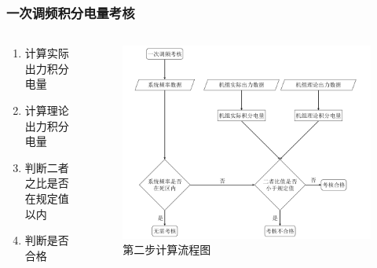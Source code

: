 \documentclass[aspectratio=169, 10pt, utf8, mathserif]{beamer}
\begin{document}
	\begin{frame}
	\frametitle{一次调频积分电量考核}
	
	\begin{columns}
		\begin{column}{.4\linewidth}
			\begin{enumerate}
				\item 计算实际出力积分电量
				\item 计算理论出力积分电量
				\item 判断二者之比是否在规定值以内
				\item 判断是否合格
			\end{enumerate}
		\end{column}
		
		\begin{column}{.6\linewidth}
		\begin{figure}[H]
			\centering
			\includegraphics[width=0.81\linewidth]{pic/screenshot031}
			\caption{第二步计算流程图}
			\label{fig:screenshot031}
		\end{figure}
			
		\end{column}
	\end{columns}
\end{frame}
\end{document}
